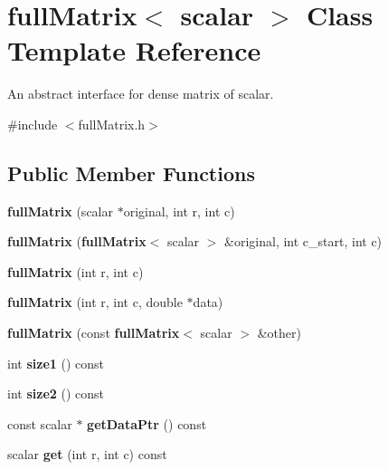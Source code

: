 \section{full\-Matrix$<$ scalar $>$ Class Template Reference}
\label{classfullMatrix}


An abstract interface for dense matrix of scalar.  




{\ttfamily \#include $<$full\-Matrix.\-h$>$}

\subsection*{Public Member Functions}
\begin{DoxyCompactItemize}
\item 
{\bfseries full\-Matrix} (scalar $\ast$original, int r, int c)\label{classfullMatrix_a164b98fcbf19db0462e3f912ad1f6c9a}

\item 
{\bfseries full\-Matrix} ({\bf full\-Matrix}$<$ scalar $>$ \&original, int c\-\_\-start, int c)\label{classfullMatrix_a6afcd37aa8b8f3627238359883f83b1e}

\item 
{\bfseries full\-Matrix} (int r, int c)\label{classfullMatrix_a873075dcbf65e6cda11f9dd74e0f64e6}

\item 
{\bfseries full\-Matrix} (int r, int c, double $\ast$data)\label{classfullMatrix_abbae4023db6557e7282437546f9e1a8e}

\item 
{\bfseries full\-Matrix} (const {\bf full\-Matrix}$<$ scalar $>$ \&other)\label{classfullMatrix_a44e2a03f9372a2ad1456fc594e25011a}

\item 
int {\bfseries size1} () const \label{classfullMatrix_ad8aac7de8f59da96decf71f1373ebf16}

\item 
int {\bfseries size2} () const \label{classfullMatrix_aa095c160618e1cbb54d56b9824647a67}

\item 
const scalar $\ast$ {\bfseries get\-Data\-Ptr} () const \label{classfullMatrix_af920edd1814e7ae3815f99917676413f}

\item 
scalar {\bfseries get} (int r, int c) const \label{classfullMatrix_a61d4532cd32e463925f1a94a2785e22b}


\end{DoxyCompactItemize}
